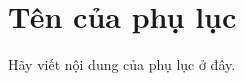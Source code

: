 
\chapter{Tên của phụ lục} %

\label{AppendixA} %

\label{AppendixB}
Hãy viết nội dung của phụ lục ở đây.